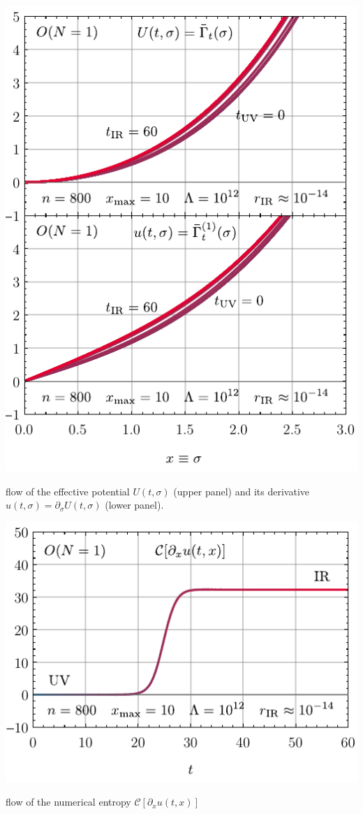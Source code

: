 	{%
		\includegraphics[width=\subcaptionFigureWidth]{0d/figures/sc_ii_p_on=1_n=800_xmax=10_lambda=1.0e12_tir=60_rg_flow.pdf}
		\caption{\frg{} flow of the effective potential $U ( t , \sigma )$ (upper panel) and its derivative $u ( t , \sigma ) = \partial_\sigma U ( t , \sigma )$ (lower panel).}
		\label{fig:sc_ii_p_on=1_n=800_xmax=10_lambda=1.0e12_tir=60_rg_flow}%
	}%
	{
		\includegraphics[width=\subcaptionFigureWidth-0.02cm]{0d/figures/sc_ii_p_on=1_n=800_xmax=10_lambda=1.0e12_tir=60_entropy_flow.pdf}
		\caption{\frg{} flow of the numerical entropy $\mathcal{C} [ \partial_x u ( t, x ) ]$}%
		\label{fig:sc_ii_p_on=1_n=800_xmax=10_lambda=1.0e12_tir=60_entropy_flow}%
	} %
